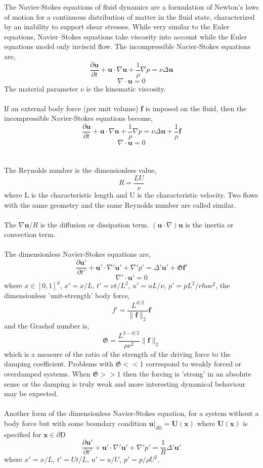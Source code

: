\documentclass[12pt]{article}
\begin{document}
\begin{flushleft}
\qquad The Navier-Stokes equations of fluid dynamics are a formulation of
Newton's laws of motion for a continuous distribution of matter in the
fluid state, characterized by an inability to support shear stresses. While very similar to the Euler equations, Navier–Stokes equations take viscosity into account while the Euler equations model only inviscid flow. The incompressible Navier-Stokes equations are,
$$\frac{\partial \textbf{u}}{\partial t}+\textbf{u}\cdot\nabla \textbf{u}+\frac{1}{\rho}\nabla p = \nu\Delta \textbf{u}$$
$$\nabla \cdot \textbf{u} = 0$$
The material parameter $\nu$ is the kinematic viscosity.
\\~\\
If an external body force (per unit volume) \textbf{f} is imposed on the fluid,
then the incompressible Navier-Stokes equations become,
$$\frac{\partial \textbf{u}}{\partial t}+\textbf{u}\cdot\nabla \textbf{u}+\frac{1}{\rho}\nabla p = \nu\Delta \textbf{u} + \frac{1}{\rho}\textbf{f}$$
$$\nabla \cdot \textbf{u} = 0$$
\\~\\
The Reynolds number is the dimensionless value,
$$R = \frac{LU}{\nu}$$
where L is the characteristic length and U is the characteristic velocity. Two flows with the same geometry and the same Reynolds number are called similar.
\\~\\
The 
$\nabla\textbf{u}/R$ is the diffusion or dissipation term. $(\textbf{u}\cdot\nabla)\textbf{u}$ is the inertia or convection term.
\\~\\
The dimensionless Navier-Stokes equations are,
$$\frac{\partial \textbf{u}'}{\partial t'} + \textbf{u}'\cdot\nabla'\textbf{u}'+\nabla ' p ' = \Delta'\textbf{u}'+\mathfrak{G}\textbf{f}'$$
$$\nabla'\cdot\textbf{u}' = 0$$
where $x\in[0,1]^d$, $x' = x/L$, $t' = \nu t/L^2$, $u'=uL/\nu$, $p'=pL^2/rho\nu^2$, the dimensionless 'unit-strength' body force, 
$$f' = \frac{L^{d/2}}{\|\textbf{f}\|_2}\textbf{f}$$
and the Grashof number is,
$$\mathfrak{G} = \frac{L^{3-d/2}}{\rho\nu^2}\|\textbf{f}\|_2$$
which is a measure of the ratio of the strength of the driving force to the damping coefficient. Problems with $\mathfrak{G}<<1$ correspond to weakly forced or overdamped systems. When $\mathfrak{G}>>1$ then the forcing is 'strong' in an absolute sense or the damping is truly weak and more interesting dynamical behaviour may be expected.
\\~\\
Another form of the dimensionless Navier-Stokes equation, for a system without a body force but with some boundary condition $\textbf{u}|_{\partial \text{D}}=\textbf{U}(\textbf{x})$
where $\textbf{U}(\textbf{x})$ is specified for $\textbf{x}\in\partial\text{D}$
$$\frac{\partial \textbf{u}'}{\partial t'}+\textbf{u}'\cdot\nabla'\textbf{u}'+\nabla'p'=\frac{1}{R}\Delta'\textbf{u}'$$
where $x'=x/L$, $t'=Ut/L$, $u'=u/U$, $p'=p/\rho U^2$. 
\end{flushleft}
\end{document}
